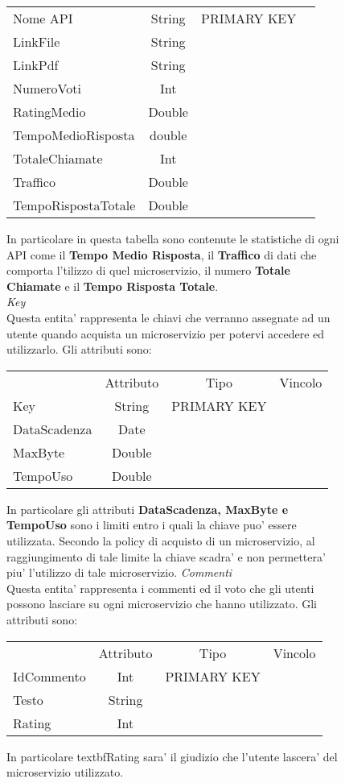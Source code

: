 {{\begin{figure}[ht]
\begin{center}
\begin{tabular}{lccc}
				Nome API&String&PRIMARY KEY\\
				LinkFile&String& \\
				LinkPdf&String& \\
				NumeroVoti&Int& \\
				RatingMedio&Double& \\
				TempoMedioRisposta&double& \\
				TotaleChiamate&Int& \\
				Traffico&Double& \\
				TempoRispostaTotale&Double& \\
			\end{tabular}
			\end{center}
			In particolare in questa tabella sono contenute le statistiche di ogni API come il \textbf{Tempo Medio Risposta}, il \textbf{Traffico} di dati che comporta l'tilizzo di quel microservizio, il numero \textbf{Totale Chiamate} e il \textbf{Tempo Risposta Totale}. \\
			\textit{Key}\\
			Questa entita' rappresenta le chiavi che verranno assegnate ad un utente quando acquista un microservizio per potervi accedere ed utilizzarlo. Gli attributi sono: \\
			\begin{center}
			\begin{tabular}{lccc}
				&Attributo&Tipo&Vincolo\\
				Key&String&PRIMARY KEY\\
				DataScadenza&Date& \\
				MaxByte&Double& \\
				TempoUso&Double& \\
			\end{tabular}
			\end{center}
			In particolare gli attributi \textbf{DataScadenza, MaxByte e TempoUso} sono i limiti entro i quali la chiave puo' essere utilizzata. Secondo la policy di acquisto di un microservizio, al raggiungimento di tale limite la chiave scadra' e non permettera' piu' l'utilizzo di tale microservizio.
			\textit{Commenti}\\
			Questa entita' rappresenta i commenti ed il voto  che gli utenti possono lasciare su ogni microservizio che hanno utilizzato. Gli attributi sono:
			\begin{center}
			\begin{tabular}{lccc}
				&Attributo&Tipo&Vincolo\\
				IdCommento&Int&PRIMARY KEY\\
				Testo&String& \\
				Rating&Int& \\
			\end{tabular}
			\end{center}
			In particolare textbf{Rating} sara' il giudizio che l'utente lascera' del microservizio utilizzato. \\
			

\end{figure}}}
